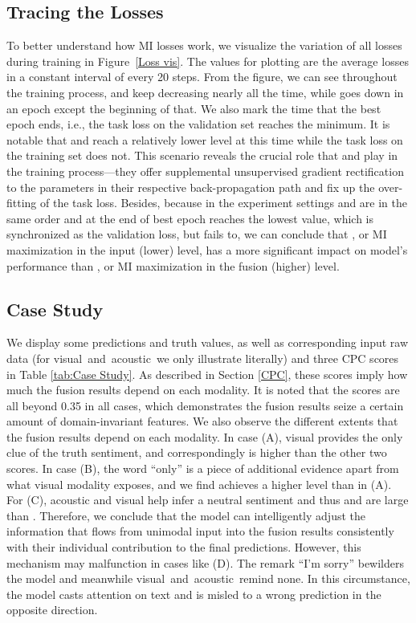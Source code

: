 \documentclass[11pt]{article}
\newcommand{\mv}{visual}
\newcommand{\ma}{acoustic}
\begin{document}
\subsection{Tracing the Losses}
To better understand how MI losses work, we visualize the variation of all losses during training in Figure~\ref{Loss vis}. 
The values for plotting are the average losses in a constant interval of every 20 steps.
From the figure, we can see throughout the training process,  and  keep decreasing nearly all the time, while  goes down in an epoch except the beginning of that. 
We also mark the time that the best epoch ends, i.e., the task loss on the validation set reaches the minimum. 
It is notable that  and  reach a relatively lower level at this time while the task loss on the training set does not. This scenario reveals the crucial role that  and  play in the training process---they offer supplemental unsupervised gradient rectification to the parameters in their respective back-propagation path and fix up the over-fitting of the task loss.
Besides, because in the experiment settings  and  are in the same order and at the end of best epoch  reaches the lowest value, which is synchronized as the validation loss, but  fails to, we can conclude that  , or MI maximization in the input (lower) level, has a more significant impact on model's performance than , or MI maximization in the fusion (higher) level.

\subsection{Case Study} \label{Case Study}
We display some predictions and truth values, as well as corresponding input raw data (for \mv~and~\ma~we only illustrate literally) and three CPC scores in Table \ref{tab:Case Study}. 
As described in Section \ref{CPC}, these scores imply how much the fusion results depend on each modality.
It is noted that the scores are all beyond 0.35 in all cases, which demonstrates the fusion results seize a certain amount of domain-invariant features. 
We also observe the different extents that the fusion results depend on each modality. 
In case (A), visual provides the only clue of the truth sentiment, and correspondingly  is higher than the other two scores. 
In case (B), the word ``only'' is a piece of additional evidence apart from what visual modality exposes, and we find  achieves a higher level than in (A).
For (C), acoustic and visual help infer a neutral sentiment and thus  and  are large than .
Therefore, we conclude that the model can intelligently adjust the information that flows from unimodal input into the fusion results consistently with their individual contribution to the final predictions.
However, this mechanism may malfunction in cases like (D). The remark ``I'm sorry'' bewilders the model and meanwhile \mv~and~\ma~remind none. In this circumstance, the model casts attention on text and is misled to a wrong prediction in the opposite direction.
\end{document}
